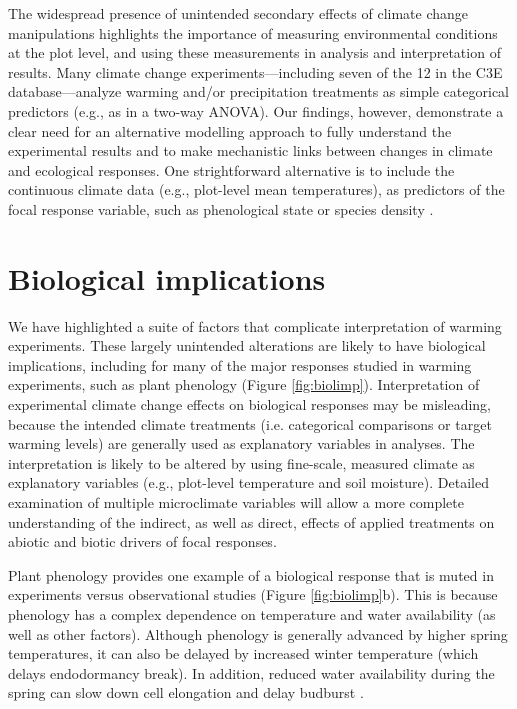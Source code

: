 \documentclass{article}
\begin{document}
\par The widespread presence of unintended secondary effects of climate change manipulations highlights the importance of measuring environmental conditions at the plot level, and using these measurements in analysis and interpretation of results. Many climate change experiments---including seven of the 12 in the C3E database---analyze warming and/or precipitation treatments as simple categorical predictors (e.g., as in a two-way ANOVA). Our findings, however, demonstrate a clear need for an alternative modelling approach to fully understand the experimental results and to make mechanistic links between changes in climate and ecological responses. One strightforward alternative is to include the continuous climate data (e.g., plot-level mean temperatures), as predictors of the focal response variable, such as phenological state or species density \citep [e.g.,][]{marchin2015, pelini2014}. 

\section* {Biological implications}

\par We have highlighted a suite of factors that complicate interpretation of warming experiments. These largely unintended alterations are likely to have biological implications, including for many of the major responses studied in warming experiments, such as plant phenology (Figure \ref{fig:biolimp}). Interpretation of experimental climate change effects on biological responses may be misleading, because the intended climate treatments (i.e. categorical comparisons or target warming levels) are generally used as explanatory variables in analyses. The interpretation is likely to be altered by using fine-scale, measured climate as explanatory variables (e.g., plot-level temperature and soil moisture). Detailed examination of multiple microclimate variables will allow a more complete understanding of the indirect, as well as direct, effects of applied treatments on abiotic and biotic drivers of focal responses.

\par Plant phenology provides one example of a biological response that is muted in experiments versus observational studies (Figure \ref{fig:biolimp}b). This is because phenology has a complex dependence on temperature and water availability (as well as other factors). Although phenology is generally advanced by higher spring temperatures, it can also be delayed by increased winter temperature (which delays endodormancy break). In addition, reduced water availability during the spring can slow down cell elongation and delay budburst \citep{penuelas2004,ourcival2011,craine2012,matthews2016}.
\end{document}
